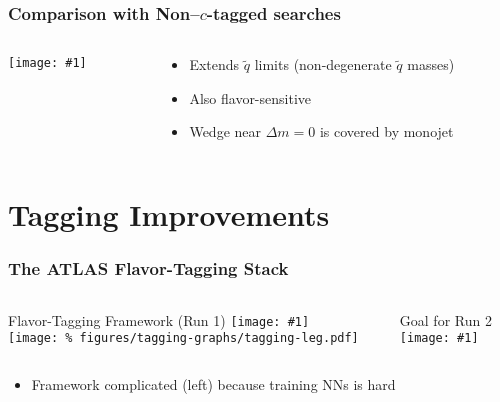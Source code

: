 \documentclass[usenames,dvipsnames]{beamer}
\newcommand{\widegraphic}[1]{\texttt{[image: \#1]}}
\begin{document}
\begin{frame}
  \frametitle{Comparison with Non--$c$-tagged searches%
  }
  \begin{columns}
    \begin{column}{0.6\textwidth}
      \widegraphic{int/figures/limit_tree/full_exclusion/exclusion_inclusive.pdf}
    \end{column}
    \begin{column}{0.4\textwidth}
      \begin{itemize}
      \item Extends $\tilde{q}$ limits (non-degenerate $\tilde{q}$ masses)
      \item Also flavor-sensitive
      \item Wedge near $\Delta m = 0$ is covered by monojet
      \end{itemize}
    \end{column}
  \end{columns}
\end{frame}


\section{Tagging Improvements}


\begin{frame}
  \frametitle{The ATLAS Flavor-Tagging Stack}
  \begin{columns}
    \begin{column}{0.6\textwidth}
      \begin{center}
        Flavor-Tagging Framework (Run 1)
        \widegraphic{%
figures/tagging-graphs/tagging-full-nogaia.pdf} \\
        \texttt{[image: \%
figures/tagging-graphs/tagging-leg.pdf]}
      \end{center}
    \end{column}
    \vline
    \begin{column}{0.4\textwidth}
      \begin{center}
        Goal for Run 2 \\[0.1cm]
        \widegraphic{%
figures/tagging-graphs/tagging-gaia-future.pdf}
      \end{center}
    \end{column}
  \end{columns}
  \begin{itemize}
  \item Framework complicated (left) because training NNs is hard
  \end{itemize}
\end{frame}
\end{document}
